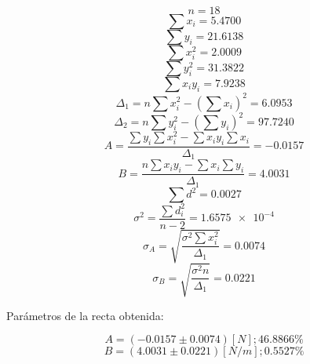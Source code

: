 \documentclass[letter,11pt]{article}
\begin{document}
\begin{equation*}
    n = 18
\end{equation*}
\begin{equation*}
    \sum x_i = 5.4700
\end{equation*}
\begin{equation*}
    \sum y_i = 21.6138
\end{equation*}
\begin{equation*}
    \sum x^2_i = 2.0009
\end{equation*}
\begin{equation*}
    \sum y^2_i = 31.3822
\end{equation*}
\begin{equation*}
    \sum x_i y_i = 7.9238
\end{equation*}
\begin{equation*}
    \Delta_1 = n \sum x^2_i - \left( \sum x_i \right)^2 = 6.0953
\end{equation*}
\begin{equation*}
    \Delta_2 = n \sum y^2_i - \left( \sum y_i \right)^2 = 97.7240
\end{equation*}
\begin{equation*}
    A = \frac{\sum y_i \sum x^2_i - \sum x_i y_i \sum x_i}{\Delta_1} = -0.0157
\end{equation*}
\begin{equation*}
    B = \frac{n \sum x_i y_i - \sum x_i \sum y_i}{\Delta_1} = 4.0031
\end{equation*}
\begin{equation*}
    \sum d^2 = 0.0027
\end{equation*}
\begin{equation*}
    \sigma^2 = \frac{\sum d^2_i}{n-2} = \num{1.6575e-4}
\end{equation*}
\begin{equation*}
    \sigma_A = \sqrt{\frac{\sigma^2 \sum x^2_i}{\Delta_1}} = 0.0074
\end{equation*}
\begin{equation*}
    \sigma_B = \sqrt{\frac{\sigma^2 n}{\Delta_1}} = 0.0221
\end{equation*}
\vspace{0.10cm}

Parámetros de la recta obtenida:

\begin{equation*}
    A = (-0.0157 \pm 0.0074) [N]; 46.8866\%
\end{equation*}
\begin{equation*}
    B = (4.0031 \pm 0.0221) [N/m]; 0.5527\%
\end{equation*}
\vspace{0.10cm}
\end{document}
